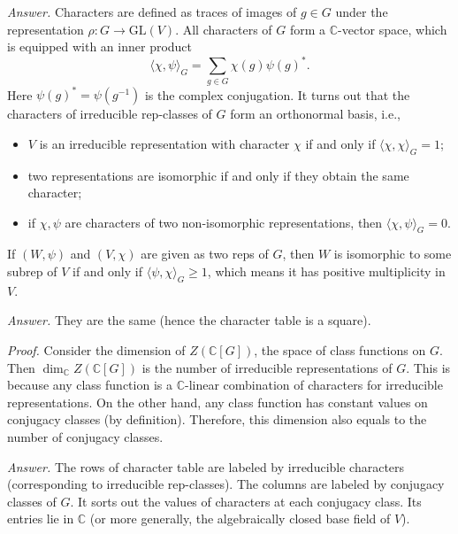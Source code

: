 \documentclass{mathproblems}
\newcommand\C{\mathbb{C}}
\newcommand\GL{\mathrm{GL}}
\begin{document}
\begin{questions}

\textit{Answer.} Characters are defined as traces of images of $g\in G$ under the representation $\rho: G\to \GL(V)$. All characters of $G$ form a $\C$-vector space, which is equipped with an inner product
$$
\langle \chi,\psi \rangle_G=\sum_{g\in G} \chi(g) \psi(g)^*.
$$
Here $\psi(g)^*=\psi(g^{-1})$ is the complex conjugation. It turns out that the characters of irreducible rep-classes of $G$ form an orthonormal basis, i.e.,
\begin{itemize}
    \item $V$ is an irreducible representation with character $\chi$ if and only if $\langle \chi,\chi\rangle_G=1$;
    \item two representations are isomorphic if and only if they obtain the same character;
    \item if $\chi,\psi$ are characters of two non-isomorphic representations, then $\langle\chi,\psi\rangle_G=0$.
\end{itemize}
If $(W,\psi)$ and $(V,\chi)$ are given as two reps of $G$, then $W$ is isomorphic to some subrep of $V$ if and only if $\langle \psi,\chi \rangle_G\geqslant 1$, which means it has positive multiplicity in $V$.


\textit{Answer.} They are the same (hence the character table is a square).

\textit{Proof.} Consider the dimension of $Z(\C[G])$, the space of class functions on $G$. Then $\dim_{\C} Z(\C[G])$ is the number of irreducible representations of $G$. This is because any class function is a $\C$-linear combination of characters for irreducible representations. On the other hand, any class function has constant values on conjugacy classes (by definition). Therefore, this dimension also equals to the number of conjugacy classes. 


\textit{Answer.} The rows of character table are labeled by irreducible characters (corresponding to irreducible rep-classes). The columns are labeled by conjugacy classes of $G$. It sorts out the values of characters at each conjugacy class. Its entries lie in $\C$ (or more generally, the algebraically closed base field of $V$).


\end{questions}
\end{document}
